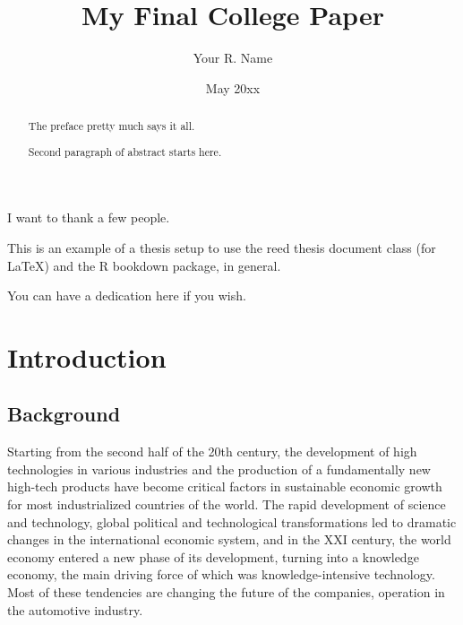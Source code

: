 \documentclass[12pt,twoside]{reedthesis}
\title{My Final College Paper}
\author{Your R. Name}
\date{May 20xx}
\begin{document}
  \maketitle

\frontmatter %
\pagestyle{empty} %
  \begin{acknowledgements}
    I want to thank a few people.
  \end{acknowledgements}
  \begin{preface}
    This is an example of a thesis setup to use the reed thesis document class
    (for LaTeX) and the R bookdown package, in general.
  \end{preface}
  \hypersetup{linkcolor=black}
  \setcounter{tocdepth}{2}
  \tableofcontents

  \listoftables

  \listoffigures
  \begin{abstract}
    The preface pretty much says it all.
    
    \par
    
    Second paragraph of abstract starts here.
  \end{abstract}
  \begin{dedication}
    You can have a dedication here if you wish.
  \end{dedication}
\mainmatter %
\pagestyle{fancyplain} %

\hypertarget{introduction}{%
\chapter*{Introduction}\label{introduction}}

\hypertarget{background}{%
\section*{Background}\label{background}}

Starting from the second half of the 20th century, the development of high technologies in various industries and the production of a fundamentally new high-tech products have become critical factors in sustainable economic growth for most industrialized countries of the world. The rapid development of science and technology, global political and technological transformations led to dramatic changes in the international economic system, and in the XXI century, the world economy entered a new phase of its development, turning into a knowledge economy, the main driving force of which was knowledge-intensive technology. Most of these tendencies are changing the future of the companies, operation in the automotive industry.
\end{document}
